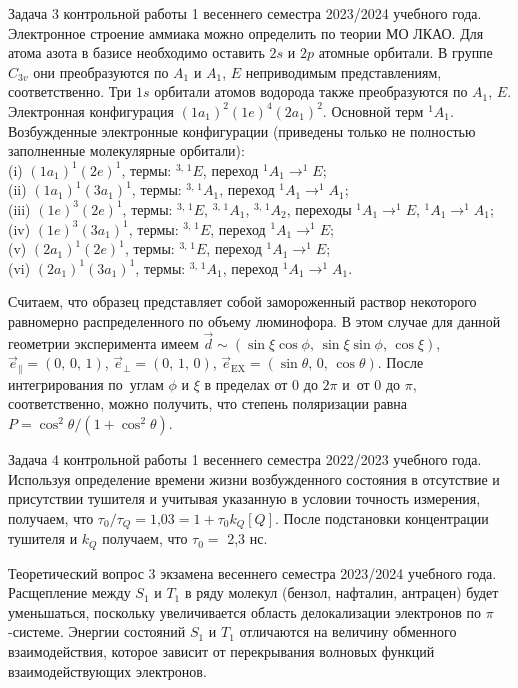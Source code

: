  Задача 3 контрольной работы 1 весеннего семестра 2023/2024 учебного года. Электронное строение аммиака можно определить по теории МО ЛКАО. Для атома азота в базисе необходимо оставить $2s$ и $2p$ атомные орбитали. В группе $C_{3v}$ они преобразуются по $A_1$ и $A_1$, $E$ неприводимым представлениям, соответственно. Три $1s$ орбитали атомов водорода также преобразуются по $A_1$, $E$. Электронная конфигурация $(1a_1)^2(1e)^4(2a_1)^2$. Основной терм $^1A_1$. Возбужденные электронные конфигурации (приведены только не полностью заполненные молекулярные орбитали): \\
(i) $(1a_1 )^1 (2e)^1$, термы: $^{3,\,1}E$, переход $^1A_1 \rightarrow ^1E$;\\
(ii) $(1a_1 )^1 (3a_1)^1$, термы: $^{3,\,1}A_1$, переход $^1A_1 \rightarrow ^1A_1$;\\
(iii) $(1e)^3 (2e)^1$, термы: $^{3,\,1}E$, $^{3,\,1}A_1$, $^{3,\,1}A_2$, переходы $^1A_1 \rightarrow ^1E$, $^1A_1 \rightarrow ^1A_1$;\\
(iv) $(1e)^3 (3a_1 )^1$, термы: $^{3,\,1}E$, переход $^1A_1 \rightarrow ^1E$;\\
(v) $(2a_1 )^1 (2e)^1$, термы: $^{3,\,1}E$, переход $^1A_1 \rightarrow ^1E$;\\
(vi) $(2a_1 )^1 (3a_1 )^1$, термы: $^{3,\,1}A_1$, переход $^1A_1 \rightarrow ^1A_1$.\par
{} Считаем, что образец представляет собой замороженный раствор некоторого равномерно распределенного по объему люминофора. В этом случае для данной геометрии эксперимента имеем $\vec{d} \sim (\sin{\xi}\cos{\phi},\, \sin{\xi}\sin{\phi},\, \cos{\xi})$, $\vec{e}_{\parallel} = (0,\,0,\,1)$, $\vec{e}_{\perp} = (0,\,1,\,0)$, $\vec{e}_{\text{EX}} = (\sin{\theta},\, 0,\, \cos{\theta})$. После интегрирования по~углам $\phi$ и $\xi$ в пределах от 0 до $2\pi$ и~от 0 до $\pi$, соответственно, можно получить, что степень поляризации равна $P = \cos^2{\theta} / \left( 1 + \cos^2{\theta}\right)$.\par
{} Задача 4 контрольной работы 1 весеннего семестра 2022/2023 учебного года. Используя определение времени жизни возбужденного состояния в отсутствие и присутствии тушителя и учитывая указанную в условии точность измерения, получаем, что $\tau_0 / \tau_Q = \text{1,03} = 1 + \tau_0 k_Q \left[ Q \right]$. После подстановки концентрации тушителя и $k_Q$ получаем, что $\tau_0 = $ 2,3 нс.\par
{} Теоретический вопрос 3 экзамена весеннего семестра 2023/2024 учебного года. Расщепление между $S_1$ и $T_1$ в ряду молекул (бензол, нафталин, антрацен) будет уменьшаться, поскольку увеличивается область делокализации электронов по $\pi$-системе. Энергии состояний $S_1$ и $T_1$ отличаются на величину обменного взаимодействия, которое зависит от перекрывания волновых функций взаимодействующих электронов.\par
